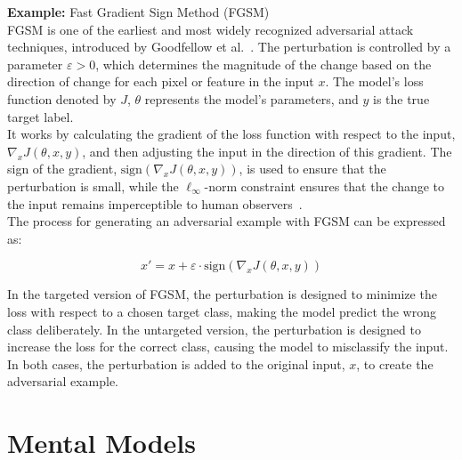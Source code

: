 \documentclass[a4paper, oneside]{discothesis}
\begin{document}
\begin{examplebox}
	\textbf{Example:} Fast Gradient Sign Method (FGSM) \\

	FGSM is one of the earliest and most widely recognized adversarial attack techniques, introduced by Goodfellow et al.~\cite{goodfellow2014explaining}. The perturbation is controlled by a parameter $\varepsilon > 0$, which determines the magnitude of the change based on the direction of change for each pixel or feature in the input $x$. The model's loss function denoted by $J$, $\theta$ represents the model's parameters, and $y$ is the true target label. \\
	
	It works by calculating the gradient of the loss function with respect to the input, $\nabla_x J(\theta, x, y)$, and then adjusting the input in the direction of this gradient. The sign of the gradient, $\text{sign}(\nabla_x J(\theta, x, y))$, is used to ensure that the perturbation is small, while the $\ell_\infty$-norm constraint ensures that the change to the input remains imperceptible to human observers~\cite{zhang2019adversarial}. \\
	
	The process for generating an adversarial example with FGSM can be expressed as:
	
	$$x' = x + \varepsilon \cdot \text{sign}(\nabla_x J(\theta, x, y))$$
	
	In the targeted version of FGSM, the perturbation is designed to minimize the loss with respect to a chosen target class, making the model predict the wrong class deliberately. In the untargeted version, the perturbation is designed to increase the loss for the correct class, causing the model to misclassify the input. In both cases, the perturbation is added to the original input, $x$, to create the adversarial example.
\end{examplebox}







\section{Mental Models}
\end{document}
